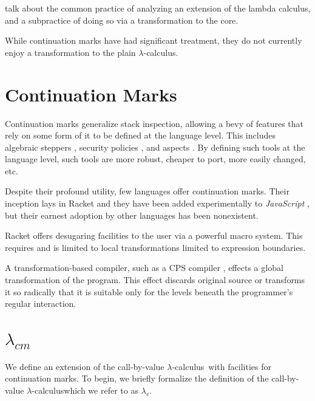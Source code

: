 \documentclass{llncs}
\newcommand{\cm}[0]{$\lambda_{cm}$}
\newcommand{\lv}[0]{$\lambda_v$}
\newcommand{\lc}[0]{$\lambda$-calculus}
\begin{document}
talk about the common practice of analyzing an extension of the lambda calculus, and a subpractice of doing so via a transformation to the core.

While continuation marks have had significant treatment, they do not currently enjoy a transformation to the plain $\lambda$-calculus.

\section{Continuation Marks}

Continuation marks generalize stack inspection, allowing a bevy of features that rely on some form of it to be defined at the language level. This includes algebraic steppers \cite{clements2001modeling}, security policies \cite{clements2004tail}, and aspects \cite{tucker2003pointcuts}. By defining such tools at the language level, such tools are more robust, cheaper to port, more easily changed, etc.

Despite their profound utility, few languages offer continuation marks. Their inception lays in Racket \cite{plt-tr1} and they have been added experimentally to \emph{JavaScript} \cite{clements2008implementing}, but their earnest adoption by other languages has been nonexistent.



Racket offers desugaring facilities to the user via a powerful macro system. This requires and is limited to local transformations limited to expression boundaries.

A transformation-based compiler, such as a CPS compiler \cite{appel2007compiling}, effects a global transformation of the program. This effect discards original source or transforms it so radically that it is suitable only for the levels beneath the programmer's regular interaction.

\section{\cm}

We define an extension of the call-by-value \lc\ with facilities for continuation marks. To begin, we briefly formalize the definition of the call-by-value \lc which we refer to as \lv.
\end{document}
